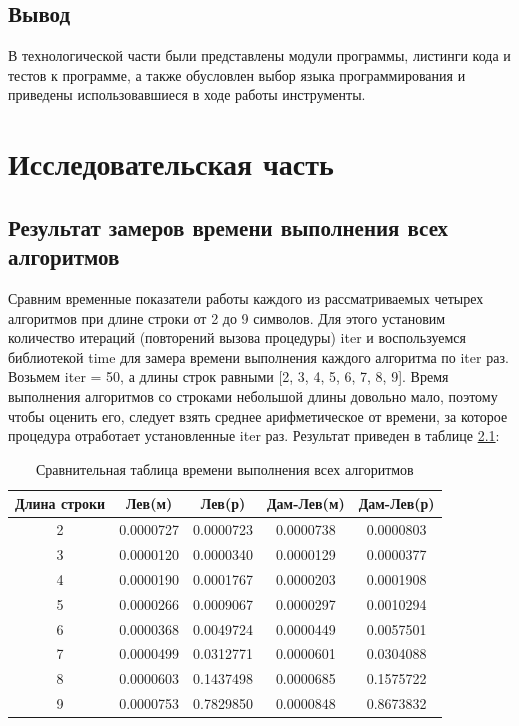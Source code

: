 \documentclass[12pt]{report}
\begin{document}
\section{Вывод}
В технологической части были представлены модули программы, листинги кода и тестов к программе, а также обусловлен выбор языка программирования и приведены использовавшиеся в ходе работы инструменты.


\chapter{Исследовательская часть}

\section{Результат замеров времени выполнения всех алгоритмов} 

Сравним временные показатели работы каждого из рассматриваемых четырех алгоритмов при длине строки от 2 до 9 символов. Для этого установим количество итераций (повторений вызова процедуры) iter и воспользуемся библиотекой time для замера времени выполнения каждого алгоритма по iter раз. Возьмем iter = 50, а длины строк равными [2, 3, 4, 5, 6, 7, 8, 9]. Время выполнения алгоритмов со строками небольшой длины довольно мало, поэтому чтобы оценить его, следует взять среднее арифметическое от времени, за которое процедура отработает установленные iter раз. Результат приведен в таблице \ref{table:ref1}:
\begin{table}[ht]
	\centering
	\caption{Сравнительная таблица времени выполнения всех алгоритмов}
	\begin{tabular}{|c c c c c|}
		\hline
		Длина строки & Лев(м) & Лев(р) & Дам-Лев(м) & Дам-Лев(р) \\ [0.5ex] 
 		\hline\hline
		2 & 0.0000727 & 0.0000723 & 0.0000738 & 0.0000803\\
 		\hline
 		3 & 0.0000120 & 0.0000340 & 0.0000129 & 0.0000377\\
 		\hline
 		4 & 0.0000190 & 0.0001767 & 0.0000203 & 0.0001908\\
 		\hline
		5 & 0.0000266 & 0.0009067 & 0.0000297 & 0.0010294\\
		\hline
		6 & 0.0000368 & 0.0049724 & 0.0000449 & 0.0057501\\
		\hline
		7 & 0.0000499 & 0.0312771 & 0.0000601 & 0.0304088\\
		\hline
		8 & 0.0000603 & 0.1437498 & 0.0000685 & 0.1575722\\
		\hline
		9 & 0.0000753 & 0.7829850 & 0.0000848 & 0.8673832\\
		\hline
	\end{tabular}
	\label{table:ref1}
\end{table} 
\end{document}
